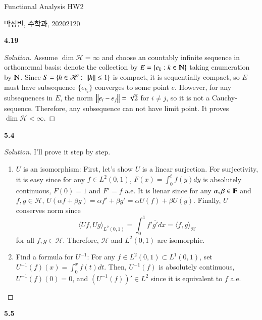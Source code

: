 \documentclass[a4paper, 12pt]{article}
\theoremstyle{Mydefinition}
\theoremstyle{Mytheorem}
\begin{document}
\thispagestyle{myfirstpage}
\begin{center}
	\Large{Functional Analysis HW2}
\end{center}
박성빈, 수학과, 20202120

\noindent \textbf{4.19}

\begin{proof}[Solution]
Assume $\dim\mathscr{H}=\infty$ and choose an countably infinite sequence in orthonormal basis: denote the collection by $E=\{e_k:k\in\varmathbb{N}\}$ taking enumeration by $\varmathbb{N}$. Since $S=\{h\in\mathscr{H}:~\norm{h}\leq 1\}$ is compact, it is sequentially compact, so $E$ must have subsequence $\{e_{k_i}\}$ converges to some point $e$. However, for any subsequences in $E$, the norm $\norm{e_i-e_j}=\sqrt{2}$ for $i\neq j$, so it is not a Cauchy-sequence. Therefore, any subsequence can not have limit point. It proves $\dim \mathscr{H}<\infty$.
\end{proof}

\noindent \textbf{5.4}

\begin{proof}[Solution]
I'll prove it step by step.
\begin{enumerate}
    \item $U$ is an isomorphism: First, let's show $U$ is a linear surjection. For surjectivity, it is easy since for any $f\in L^2(0,1)$, $F(x)=\int_0^t f(y) dy$ is absolutely continuous, $F(0)=1$ and $F'=f$ a.e. It is lienar since for any $\alpha,\beta\in \varmathbb{F}$ and $f,g\in\mathscr{H}$, $U(\alpha f+\beta g) = \alpha f'+\beta g' = \alpha U(f)+\beta U(g)$. Finally, $U$ conserves norm since
    \begin{equation}
        \langle Uf, Ug \rangle_{L^2(0,1)} = \int_0^1 f'\overline{g'} dx = \langle f, g \rangle_{\mathscr{H}}
    \end{equation}
    for all $f,g\in \mathscr{H}$. Therefore, $\mathscr{H}$ and $L^2(0,1)$ are isomorphic.
    \item Find a formula for $U^{-1}$: For any $f\in L^2(0,1)\subset L^1(0,1)$, set $U^{-1}(f)(x) = \int_0^x f(t) dt$. Then, $U^{-1}(f)$ is absolutely continuous, $U^{-1}(f)(0) = 0$, and $\left(U^{-1}(f)\right)'\in L^2$ since it is equivalent to $f$ a.e.
\end{enumerate}
\end{proof}

\noindent \textbf{5.5}
\end{document}
